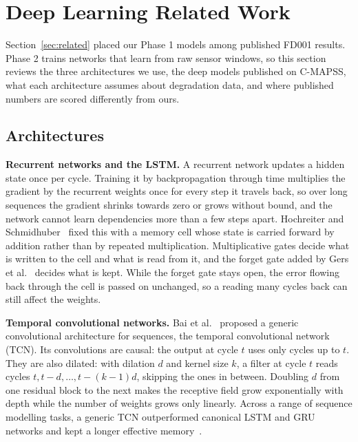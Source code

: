 \section{Deep Learning Related Work}
\label{sec:dl-related}

Section~\ref{sec:related} placed our Phase 1 models among published FD001
results. Phase 2 trains networks that learn from raw sensor windows, so this
section reviews the three architectures we use, the deep models published on
C-MAPSS, what each architecture assumes about degradation data, and where
published numbers are scored differently from ours.

\subsection{Architectures}
\textbf{Recurrent networks and the LSTM.} A recurrent network updates a
hidden state once per cycle. Training it by backpropagation through time
multiplies the gradient by the recurrent weights once for every step it
travels back, so over long sequences the gradient shrinks towards zero or
grows without bound, and the network cannot learn dependencies more than a
few steps apart. Hochreiter and Schmidhuber~\cite{hochreiter1997lstm} fixed
this with a memory cell whose state is carried forward by addition rather
than by repeated multiplication. Multiplicative gates decide what is written
to the cell and what is read from it, and the forget gate added by Gers et
al.~\cite{gers2000forget} decides what is kept. While the forget gate stays
open, the error flowing back through the cell is passed on unchanged, so a
reading many cycles back can still affect the weights.

\textbf{Temporal convolutional networks.} Bai et al.~\cite{bai2018tcn}
proposed a generic convolutional architecture for sequences, the temporal
convolutional network (TCN). Its convolutions are causal: the output at
cycle $t$ uses only cycles up to $t$. They are also dilated: with dilation
$d$ and kernel size $k$, a filter at cycle $t$ reads cycles $t, t-d, \dots,
t-(k-1)d$, skipping the ones in between. Doubling $d$ from one residual block
to the next makes the receptive field grow exponentially with depth while
the number of weights grows only linearly. Across a range of sequence
modelling tasks, a generic TCN outperformed canonical LSTM and GRU networks
and kept a longer effective memory~\cite{bai2018tcn}.

